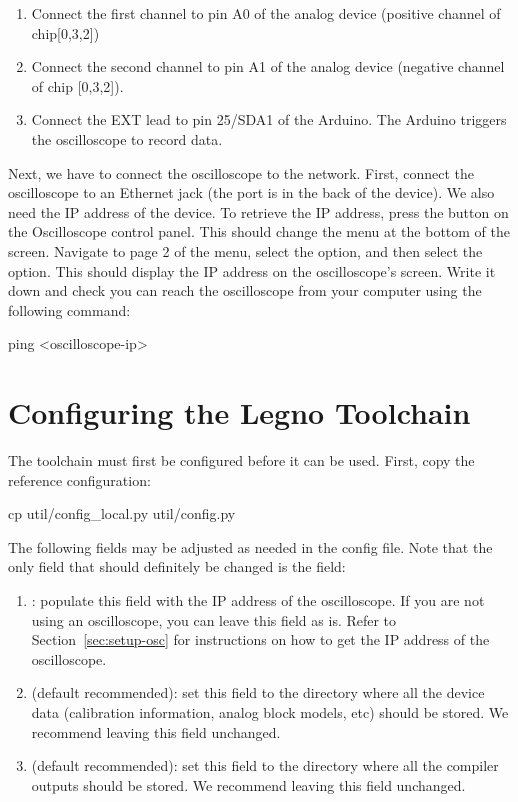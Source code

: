 \begin{enumerate}
  \item Connect the first channel to pin A0 of the analog device (positive channel of
    chip[0,3,2])
  \item Connect the second channel to pin A1 of the analog device (negative channel of chip
    [0,3,2]).
  \item Connect the EXT lead to pin 25/SDA1 of the Arduino. The Arduino triggers the
    oscilloscope to record data.
\end{enumerate}

Next, we have to connect the oscilloscope to the network. First, connect the
oscilloscope to an Ethernet jack (the port is in the back of the device). We
also need the IP address of the device. To retrieve the IP address, press the
 button on the Oscilloscope control panel. This should change the
menu at the bottom of the screen. Navigate to page 2 of the menu, select the
 option, and then select the  option. This should display
the IP address on the oscilloscope's screen. Write it down and check you can
reach the oscilloscope from your computer using the following command:

\begin{snippet}
ping <oscilloscope-ip>
\end{snippet}

\section{Configuring the Legno Toolchain}

The \legno toolchain must first be configured before it can be used. First, copy
the reference configuration:

\begin{snippet}
cp util/config_local.py util/config.py
\end{snippet}

The following fields may be adjusted as needed in the config file. Note that the
only field that should definitely be changed is the  field:

\begin{enumerate}
\item {}: populate this field with the IP address of the oscilloscope.
  If you are not using an oscilloscope, you can leave this field as is. Refer
  to Section~\ref{sec:setup-osc} for instructions on how to get the IP address
  of the oscilloscope.
\item{} (default recommended): set this field to the directory where all the device
  data (calibration information, analog block models, etc) should be stored. We
  recommend leaving this field unchanged.
\item{} (default recommended): set this field to the directory where all the compiler
  outputs should be stored. We recommend leaving this field unchanged.
\end{enumerate}

